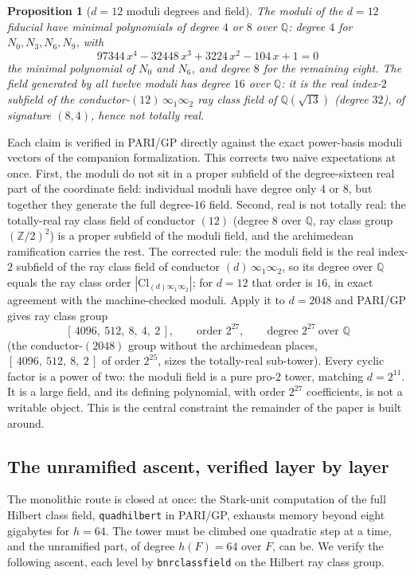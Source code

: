 \documentclass[12pt,a4paper]{article}
\newtheorem{proposition}[theorem]{Proposition}
\newcommand{\Fd}{F}
\begin{document}
\begin{proposition}[$d=12$ moduli degrees and field]
\label{prop:d12-deg}
The moduli of the $d=12$ fiducial have minimal polynomials of degree $4$ or $8$
over $\mathbb{Q}$: degree $4$ for $N_0, N_3, N_6, N_9$, with
\[
97344\,x^4 - 32448\,x^3 + 3224\,x^2 - 104\,x + 1 = 0
\]
the minimal polynomial of $N_0$ and $N_6$, and degree $8$ for the remaining
eight.  The field generated by all twelve moduli has degree $16$ over
$\mathbb{Q}$: it is the real index-$2$ subfield of the
conductor-$(12)\,\infty_1\infty_2$ ray class field of $\mathbb{Q}(\sqrt{13})$
(degree $32$), of signature $(8,4)$, hence not totally real.
\end{proposition}

Each claim is verified in PARI/GP directly against the exact power-basis moduli
vectors of the companion formalization.  This corrects two naive expectations at
once.  First, the moduli do not sit in a proper subfield of the degree-sixteen
real part of the coordinate field: individual moduli have degree only $4$ or
$8$, but together they generate the full degree-$16$ field.  Second, real is
not totally real: the totally-real ray class field of conductor $(12)$ (degree
$8$ over $\mathbb{Q}$, ray class group $(\mathbb{Z}/2)^2$) is a proper subfield
of the moduli field, and the archimedean ramification carries the rest.  The
corrected rule: the moduli field is the real index-$2$ subfield of the ray
class field of conductor $(d)\,\infty_1\infty_2$, so its degree over
$\mathbb{Q}$ equals the ray class order $|\mathrm{Cl}_{(d)\infty_1\infty_2}|$;
for $d=12$ that order is $16$, in exact agreement with the machine-checked
moduli.  Apply it to $d=2048$ and PARI/GP gives ray class group
\[
[\,4096,\ 512,\ 8,\ 4,\ 2\,],\qquad \text{order } 2^{27},
\qquad \text{degree } 2^{27}\ \text{over }\mathbb{Q}
\]
(the conductor-$(2048)$ group without the archimedean places,
$[\,4096,\ 512,\ 8,\ 2\,]$ of order $2^{25}$, sizes the totally-real
sub-tower).  Every cyclic factor is a power of two: the moduli field is a pure
pro-$2$ tower, matching $d=2^{11}$.  It is a large field, and its defining
polynomial, with order $2^{27}$ coefficients, is not a writable object.  This
is the central constraint the remainder of the paper is built around.

\subsection{The unramified ascent, verified layer by layer}

The monolithic route is closed at once: the Stark-unit computation of the full
Hilbert class field, \texttt{quadhilbert} in PARI/GP, exhausts memory beyond
eight gigabytes for $h=64$.  The tower must be climbed one quadratic step at a
time, and the unramified part, of degree $h(\Fd)=64$ over $\Fd$, can be.  We
verify the following ascent, each level by \texttt{bnrclassfield} on the Hilbert
ray class group.
\end{document}
